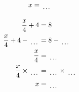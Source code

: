 \documentclass[12pt]{article}
\newcounter{minipagecount}
\begin{document}
\begin{multicols}{2}
\begin{minipage}[t]{0.45\textwidth}
\begin{align*}
        x &= \dotuline{\hspace{5mm}}\\
    \end{align*}
\end{minipage} %
\noindent{(\theminipagecount)}\hspace{0.1mm} %
\begin{minipage}[t]{0.45\textwidth} %
    \vspace{-26pt}  %
    \raggedright %
    \begin{align*} %
        \frac{x}{4} + 4 &= 8\\
        \frac{x}{4} + 4 - \dotuline{\hspace{5mm}} &= 8 - \dotuline{\hspace{5mm}}\\
        \frac{x}{4} &= \dotuline{\hspace{5mm}}\\
        \frac{x}{4} \times\dotuline{\hspace{5mm}} &= \dotuline{\hspace{5mm}} \times\dotuline{\hspace{5mm}}\\
        x &= \dotuline{\hspace{5mm}}\\
    \end{align*}
\end{minipage} %
\noindent{(\theminipagecount)}\hspace{0.1mm} %
\begin{minipage}[t]{0.45\textwidth} %
    \vspace{-26pt}  %

\end{minipage}
\end{multicols}
\end{document}

